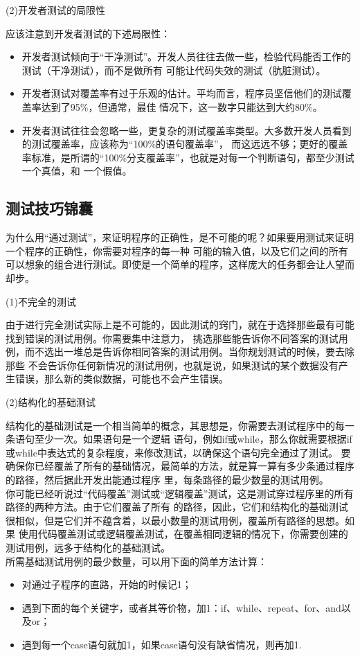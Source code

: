 \documentclass{article}
\begin{document}
\par
(2)开发者测试的局限性
\par
应该注意到开发者测试的下述局限性：
\begin{itemize}
    \item 开发者测试倾向于“干净测试”。开发人员往往去做一些，检验代码能否工作的测试（干净测试），而不是做所有
    可能让代码失效的测试（肮脏测试）。
    \item 开发者测试对覆盖率有过于乐观的估计。平均而言，程序员坚信他们的测试覆盖率达到了95\%，但通常，最佳
    情况下，这一数字只能达到大约80\%。
    \item 开发者测试往往会忽略一些，更复杂的测试覆盖率类型。大多数开发人员看到的测试覆盖率，应该称为“100\%的语句覆盖率”，
    而这远远不够；更好的覆盖率标准，是所谓的“100\%分支覆盖率”，也就是对每一个判断语句，都至少测试一个真值，和
    一个假值。
\end{itemize}

\subsection{测试技巧锦囊}
为什么用“通过测试”，来证明程序的正确性，是不可能的呢？如果要用测试来证明一个程序的正确性，你需要对程序的每一种
可能的输入值，以及它们之间的所有可以想象的组合进行测试。即使是一个简单的程序，这样庞大的任务都会让人望而却步。

\par
(1)不完全的测试
\par
由于进行完全测试实际上是不可能的，因此测试的窍门，就在于选择那些最有可能找到错误的测试用例。你需要集中注意力，
挑选那些能告诉你不同答案的测试用例，而不选出一堆总是告诉你相同答案的测试用例。当你规划测试的时候，要去除那些
不会告诉你任何新情况的测试用例，也就是说，如果测试的某个数据没有产生错误，那么新的类似数据，可能也不会产生错误。

\par
(2)结构化的基础测试
\par
结构化的基础测试是一个相当简单的概念，其思想是，你需要去测试程序中的每一条语句至少一次。如果语句是一个逻辑
语句，例如if或while，那么你就需要根据if或while中表达式的复杂程度，来修改测试，以确保这个语句完全通过了测试。
要确保你已经覆盖了所有的基础情况，最简单的方法，就是算一算有多少条通过程序的路径，然后据此开发出能通过程序
里，每条路径的最少数量的测试用例。\\
你可能已经听说过“代码覆盖”测试或“逻辑覆盖”测试，这是测试穿过程序里的所有路径的两种方法。由于它们覆盖了所有
的路径，因此，它们和结构化的基础测试很相似，但是它们并不蕴含着，以最小数量的测试用例，覆盖所有路径的思想。如果
使用代码覆盖测试或逻辑覆盖测试，在覆盖相同逻辑的情况下，你需要创建的测试用例，远多于结构化的基础测试。\\
所需基础测试用例的最少数量，可以用下面的简单方法计算：
\begin{itemize}
    \item 对通过子程序的直路，开始的时候记1；
    \item 遇到下面的每个关键字，或者其等价物，加1：if、while、repeat、for、and以及or；
    \item 遇到每一个case语句就加1，如果case语句没有缺省情况，则再加1.
\end{itemize}
\end{document}
